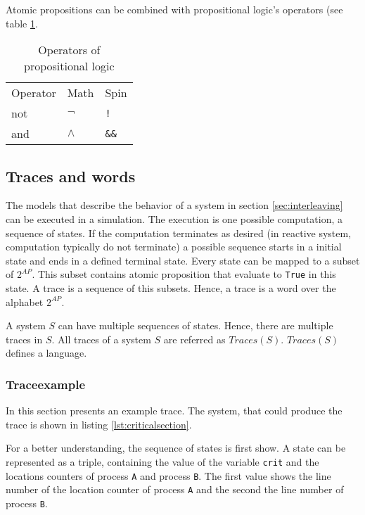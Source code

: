 \documentclass[a4paper, twoside]{article}
\begin{document}
Atomic propositions can be combined with propositional logic's operators (see table \ref{tab:operators_of_propositionallogic}.

\begin{table}
  \centering

  \begin{tabular}{l l l}
    Operator & Math & Spin \\
    not & $\neg$ & \verb|!| \\
    and & $\land$ & \verb|&&| \\
  \end{tabular}
  \caption{Operators of propositional logic }
  \label{tab:operators_of_propositionallogic}
\end{table}

\subsection{Traces and words}
\label{sec:traces}

The models that describe the behavior of a system in section \ref{sec:interleaving} can be executed in a simulation. The execution is one possible computation, a sequence of states. If the computation terminates as desired (in reactive system, computation typically do not terminate) a possible sequence starts in a initial state and ends in a defined terminal state. Every state can be mapped to a subset of $2^{AP}$. This subset contains atomic proposition that evaluate to \verb|True| in this state. A trace is a sequence of this subsets. Hence, a trace is a word over the alphabet $2^{AP}$.

A system $S$ can have multiple sequences of states. Hence, there are multiple traces in $S$. All traces of a system $S$ are referred as $Traces(S)$. $Traces(S)$ defines a language.

\subsubsection{Traceexample}
\label{sec:traceexample}

In this section presents an example trace. The system, that could produce the trace is shown in listing \ref{lst:criticalsection}.



For a better understanding, the sequence of states is first show. A state can be represented as a triple, containing the value of the variable \verb|crit| and the locations counters of process \verb|A| and process \verb|B|. The first value shows the line number of the location counter of process \verb|A| and the second the line number of process \verb|B|.
\end{document}
